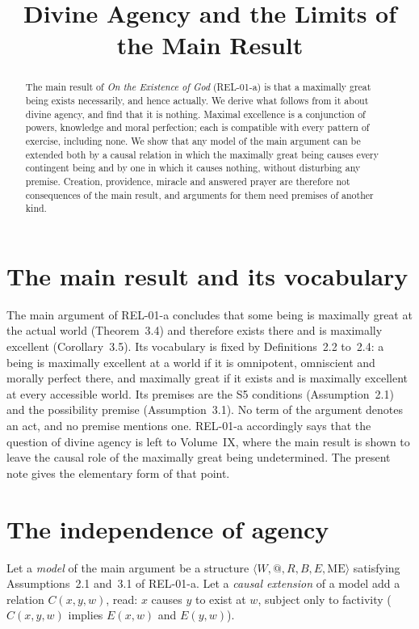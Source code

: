 \documentclass{situationist-preprint}
\title{Divine Agency and the Limits of the Main Result}
\begin{document}
\maketitle

\begin{abstract}
The main result of \emph{On the Existence of God} (REL-01-a) is that a maximally great being exists necessarily, and hence actually. We derive what follows from it about divine agency, and find that it is nothing. Maximal excellence is a conjunction of powers, knowledge and moral perfection; each is compatible with every pattern of exercise, including none. We show that any model of the main argument can be extended both by a causal relation in which the maximally great being causes every contingent being and by one in which it causes nothing, without disturbing any premise. Creation, providence, miracle and answered prayer are therefore not consequences of the main result, and arguments for them need premises of another kind.
\end{abstract}

\section{The main result and its vocabulary}

The main argument of REL-01-a concludes that some being is maximally great at the actual world (Theorem~3.4) and therefore exists there and is maximally excellent (Corollary~3.5). Its vocabulary is fixed by Definitions~2.2 to~2.4: a being is maximally excellent at a world if it is omnipotent, omniscient and morally perfect there, and maximally great if it exists and is maximally excellent at every accessible world. Its premises are the S5 conditions (Assumption~2.1) and the possibility premise (Assumption~3.1). No term of the argument denotes an act, and no premise mentions one. REL-01-a accordingly says that the question of divine agency is left to Volume~IX, where the main result is shown to leave the causal role of the maximally great being undetermined. The present note gives the elementary form of that point.

\section{The independence of agency}

Let a \emph{model} of the main argument be a structure $\langle W, @, R, B, E, \mathrm{ME}\rangle$ satisfying Assumptions~2.1 and~3.1 of REL-01-a. Let a \emph{causal extension} of a model add a relation $C(x, y, w)$, read: $x$ causes $y$ to exist at $w$, subject only to factivity ($C(x,y,w)$ implies $E(x,w)$ and $E(y,w)$).
\end{document}
